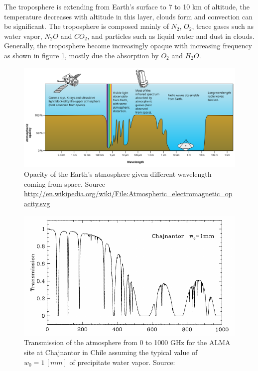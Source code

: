 The troposphere is extending from Earth's surface to 7 to 10 km of altitude, the temperature decreases with altitude in this layer, clouds form and convection can be significant. The troposphere is composed mainly of $N_2$, $O_2$, trace gases such as water vapor, $N_2O$ and $CO_2$, and particles such as liquid water and dust in clouds. Generally, the troposphere become increasingly opaque with increasing frequency as shown in figure \ref{fig:atmospheric-opacity}, mostly due the absorption by $O_2$ and $H_2O$.

\begin{figure}[htbp]
\includegraphics[width=\textwidth]{images/Atmospheric_electromagnetic_opacity}
\caption[Opacity of the Earth's atmosphere given different wavelength coming from space]{Opacity of the Earth's atmosphere given different wavelength coming from space. Source \url{http://en.wikipedia.org/wiki/File:Atmospheric_electromagnetic_opacity.svg}}
\label{fig:atmospheric-opacity}
\end{figure}

\begin{figure}[]
\includegraphics[width=\textwidth]{images/chajnantor-atm-transmission}
\caption[Transmission of the atmosphere from 0 to 1000 GHz for the ALMA site at Chajnantor in Chile]{Transmission of the atmosphere from 0 to 1000 GHz for the ALMA site at Chajnantor in Chile assuming the typical value of $w_0 = 1\,[mm]$ of precipitate water vapor. Source: \cite{taylor99}}
\label{fig:chaj-atm-tx}
\end{figure}

